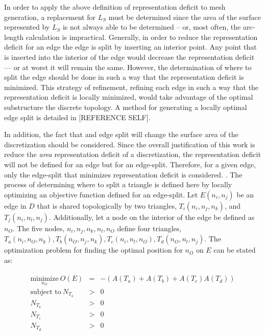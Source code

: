 In order to apply the above definition of representation deficit to mesh
generation, a replacement for $L_S$ must be determined since the area of
the surface represented by $L_S$ is not always able to be determined --
or, most often, the arc-length calculation is impractical.
Generally, in order to reduce the representation deficit for an edge 
the edge is split by inserting an interior point. Any point that is
inserted into the interior of the edge would decrease the
representation deficit --- or at worst it will remain the same. However,
the determination of where to split the edge should be done in such
a way that the representation deficit is minimized. This strategy of
refinement, refining each edge in such a way that the representation
deficit is locally minimized,  would take advantage of the optimal
substructure the discrete topology. A method for generating a locally
optimal edge split is detailed in [REFERENCE SELF].

In addition, the fact that and edge split will change the surface area
of the discretization should be considered. Since the overall
justification of this work is reduce the {\it area} representation
deficit of a discretization, the representation deficit will not be
defined for an edge but for an edge-split. Therefore, for a given edge,
only the edge-split that minimizes representation deficit is considered.
. The process of determining where to split a triangle is defined here
by locally optimizing an objective function defined for an edge-split.
Let $E\left(n_i,n_j\right)$ be an edge in $D$ that is shared
topologically by two triangles, $T_i\left(n_i,n_j,n_k\right)$, and
$T_j\left(n_i,n_l,n_j\right)$. Additionally, let a node on the interior
of the edge be defined as $n_O$. The five nodes, $n_i,n_j,n_k,n_l,n_O$
define four triangles, $T_a\left(n_i,n_O,n_k\right), T_b\left(n_O,n_j,
n_k\right), T_c\left(n_i,n_l,n_O\right), T_d\left(n_O,n_l,n_j\right)$.
The optimization problem for finding the optimal position for $n_O$ on
$E$ can be stated as:

\begin{eqnarray*}
\begin{array}{rcl}
\underset{n_O}{\text{minimize}} \ O(E) & = & -\left(A\left(T_a\right) + A\left(T_b\right) + A\left(T_c\right) A\left(T_d\right) \right) \\
\text{subject to} \ N_{T_a} & > & 0 \\
N_{T_b} & > & 0 \\ 
N_{T_c} & > & 0 \\
N_{T_d} & > & 0 \\
\end{array}
\end{eqnarray*}

